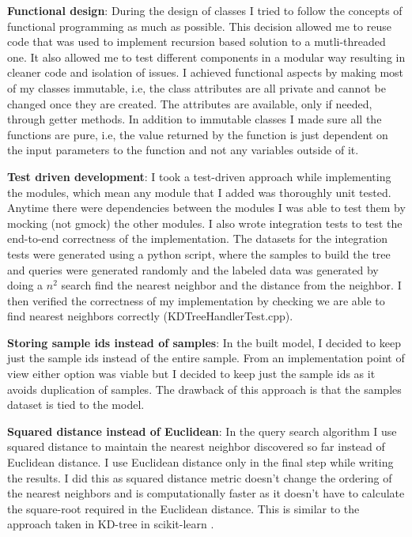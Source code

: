 \documentclass[11pt]{amsart}
\begin{document}
\begin{list}{}{\leftmargin= 1.4cm} \setlength\itemsep{1em}

\item \textbf{Functional design}: During the design of classes I tried to follow the concepts of functional programming as much as possible. This decision allowed me to reuse code that was used to implement recursion based solution to a mutli-threaded one. It also allowed me to test different components in a modular way resulting in cleaner code and isolation of issues. I achieved functional aspects by making most of my classes immutable, i.e, the class attributes are all private and cannot be changed once they are created. The attributes are available, only if needed, through getter methods. In addition to immutable classes I made sure all the functions are pure, i.e, the value returned by the function is just dependent on the input parameters to the function and not any variables outside of it.

\item \textbf{Test driven development}: I took a test-driven approach while implementing the modules, which mean any module that I added was  thoroughly unit tested. Anytime there were dependencies between the modules I was able to test them by mocking (not gmock) the other modules. I also wrote integration tests to test the end-to-end correctness of the implementation. The datasets for the integration tests were generated using a python script, where the samples to build the tree and queries were generated randomly and the labeled data was generated by doing a $n^2$ search find the nearest neighbor and the distance from the neighbor. I then verified the correctness of my implementation by checking we are able to find nearest neighbors correctly (KDTreeHandlerTest.cpp). 

\item \textbf{Storing sample ids instead of samples}: In the built model, I decided to keep just the sample ids instead of the entire sample. From an implementation point of view either option was viable but I decided to keep just the sample ids as it avoids duplication of samples. The drawback of this approach is that the samples dataset is tied to the model.

\item \textbf{Squared distance instead of Euclidean}: In the query search algorithm I use squared distance to maintain the nearest neighbor discovered so far instead of Euclidean distance. I use Euclidean distance only in the final step while writing the results. I did this as squared distance metric doesn't change the ordering of the nearest neighbors and is computationally faster as it doesn't have to calculate the square-root required in the Euclidean distance. This is similar to the approach taken in KD-tree in scikit-learn \cite{sklearn_api}.

\end{list}
\end{document}
